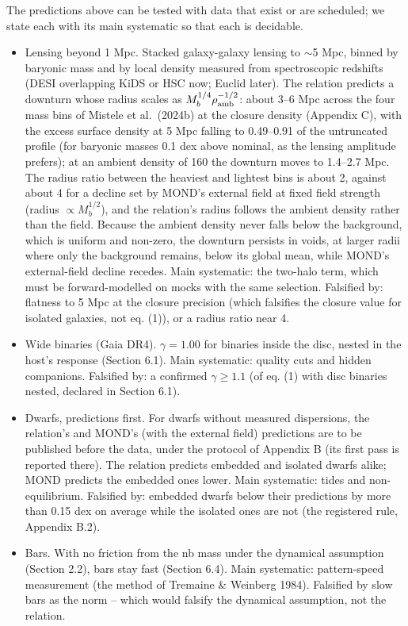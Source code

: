 \documentclass[
  10pt,
]{article}
\begin{document}
The predictions above can be tested with data that exist or are scheduled; we state each with its main systematic so that each is decidable.
\begin{itemize}
\item[(i)] Lensing beyond 1 Mpc. Stacked galaxy-galaxy lensing to $\sim$5 Mpc, binned by baryonic mass and by local density measured from spectroscopic redshifts (DESI overlapping KiDS or HSC now; Euclid later). The relation predicts a downturn whose radius scales as $M_b^{1/4}\rho_{\rm amb}^{-1/2}$: about 3--6 Mpc across the four mass bins of Mistele et al.~(2024b) at the closure density (Appendix C), with the excess surface density at 5 Mpc falling to 0.49--0.91 of the untruncated profile (for baryonic masses 0.1 dex above nominal, as the lensing amplitude prefers); at an ambient density of 160 the downturn moves to 1.4--2.7 Mpc. The radius ratio between the heaviest and lightest bins is about 2, against about 4 for a decline set by MOND's external field at fixed field strength (radius $\propto M_b^{1/2}$), and the relation's radius follows the ambient density rather than the field. Because the ambient density never falls below the background, which is uniform and non-zero, the downturn persists in voids, at larger radii where only the background remains, below its global mean, while MOND's external-field decline recedes. Main systematic: the two-halo term, which must be forward-modelled on mocks with the same selection. Falsified by: flatness to 5 Mpc at the closure precision (which falsifies the closure value for isolated galaxies, not eq. (1)), or a radius ratio near 4.
\item[(ii)] Wide binaries (Gaia DR4). $\gamma=1.00$ for binaries inside the disc, nested in the host's response (Section 6.1). Main systematic: quality cuts and hidden companions. Falsified by: a confirmed $\gamma\ge1.1$ (of eq. (1) with disc binaries nested, declared in Section 6.1).
\item[(iii)] Dwarfs, predictions first. For dwarfs without measured dispersions, the relation's and MOND's (with the external field) predictions are to be published before the data, under the protocol of Appendix B (its first pass is reported there). The relation predicts embedded and isolated dwarfs alike; MOND predicts the embedded ones lower. Main systematic: tides and non-equilibrium. Falsified by: embedded dwarfs below their predictions by more than 0.15 dex on average while the isolated ones are not (the registered rule, Appendix B.2).
\item[(iv)] Bars. With no friction from the nb mass under the dynamical assumption (Section 2.2), bars stay fast (Section 6.4). Main systematic: pattern-speed measurement (the method of Tremaine \& Weinberg 1984). Falsified by slow bars as the norm -- which would falsify the dynamical assumption, not the relation.
\end{itemize}
\end{document}
